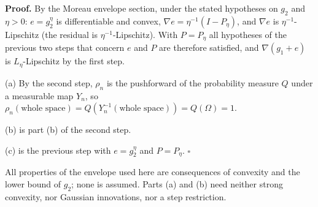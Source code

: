 \documentclass[11pt,a4paper]{article}
\begin{document}
\textbf{Proof.} By the Moreau envelope section, under the stated hypotheses on \(g_2\) and \(\eta>0\): \(e=g_2^\eta\) is differentiable and convex, \(\nabla e=\eta^{-1}(I-P_\eta)\), and \(\nabla e\) is \(\eta^{-1}\)-Lipschitz (the residual is \(\eta^{-1}\)-Lipschitz). With \(P=P_\eta\) all hypotheses of the previous two steps that concern \(e\) and \(P\) are therefore satisfied, and \(\nabla(g_1+e)\) is \(L_\eta\)-Lipschitz by the first step.




(a) By the second step, \(\rho_n\) is the pushforward of the probability measure \(Q\) under a measurable map \(Y_n\), so \(\rho_n(\text{whole space})=Q(Y_n^{-1}(\text{whole space}))=Q(\Omega)=1\).




(b) is part (b) of the second step.




(c) is the previous step with \(e=g_2^\eta\) and \(P=P_\eta\). \(\square\)




All properties of the envelope used here are consequences of convexity and the lower bound of \(g_2\); none is assumed. Parts (a) and (b) need neither strong convexity, nor Gaussian innovations, nor a step restriction.
\end{document}
